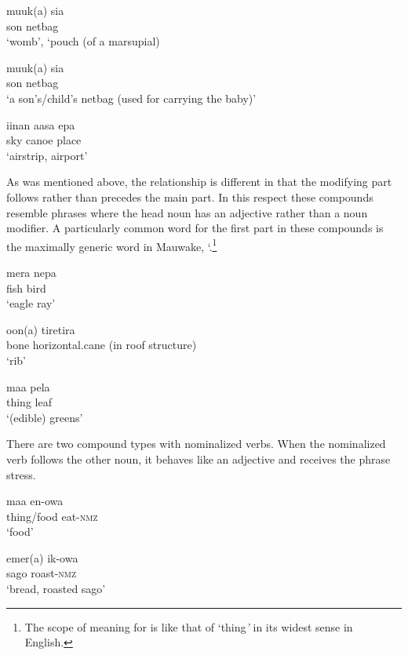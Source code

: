 \ea%
\label{ex:3:x45}
\gll muuk(a) sia \\
son netbag\\
\glt`womb', `pouch (of a marsupial) 
\z 
{}

\ea%
\label{ex:3:x1770}
\gll muuk(a) sia \\
son netbag\\
\glt`a son's/child's netbag (used for carrying the baby)'
\z

\ea%
\label{ex:3:x46}
\gll iinan aasa epa \\
sky canoe place\\
\glt`airstrip, airport'
\z

As was mentioned above, the  relationship is different in that the modifying part follows rather than precedes the main part. In this respect these compounds resemble phrases where the head noun has an adjective rather than a noun modifier. A particularly common word for the first part in these compounds is the maximally generic word in Mauwake,  `.\footnote{The scope of meaning for  is like that of `thing\textit{'} in its widest sense in English.}

\ea%
\label{ex:3:x47}
\gll mera nepa \\
fish bird\\
\glt`eagle ray'
\z

\ea%
\label{ex:3:x48}
\gll oon(a) tiretira \\
bone horizontal.cane (in roof structure)\\
\glt`rib'
\z

\ea%
\label{ex:3:x49}
\gll maa pela \\
thing leaf\\
\glt`(edible) greens'
\z

There are two compound types with nominalized verbs. When the nominalized verb follows the other noun, it behaves like an adjective and receives the phrase stress.

\ea%
\label{ex:3:x1521}
\gll maa en-owa \\
thing/food eat-\textsc{nmz}\\
\glt`food'
\z

\ea%
\label{ex:3:x1522}
\gll emer(a) ik-owa \\
sago roast-\textsc{nmz}\\
\glt`bread, roasted sago'
\z

